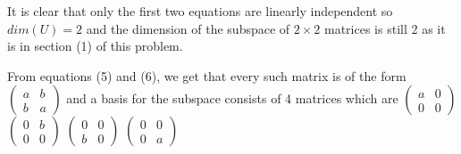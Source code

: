 \documentclass[12pt]{article}
\begin{document}
It is clear that only the first two equations are linearly independent so $dim(U)=2$ and the dimension of the subspace of $2 \times 2$ matrices is still 2 as it is in section (1) of this problem.

From equations (5) and (6), we get that every such matrix is of the form $\begin{pmatrix}
a & b \\ b& a
\end{pmatrix}$ and a basis for the subspace consists of 4 matrices which are $\begin{pmatrix}
a & 0 \\ 0& 0
\end{pmatrix}$ $\begin{pmatrix}
0 & b \\ 0& 0
\end{pmatrix}$
$\begin{pmatrix}
0 & 0 \\ b& 0
\end{pmatrix}$
$\begin{pmatrix}
0 & 0 \\ 0& a
\end{pmatrix}$
\end{document}
